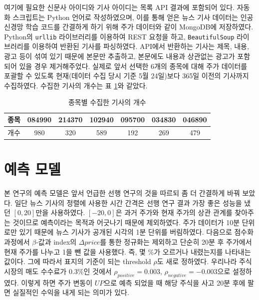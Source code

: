 \documentclass[a4paper,10pt]{article}
\begin{document}
여기에 필요한 신문사 아이디와 기사 아이디는 목록 API 결과에 포함되어 있다.
자동화 스크립트는 Python 언어로 작성하였으며, 이를 통해 얻은 뉴스 기사 데이터는 인공 신경망 학습 코드를 간결하게 하기 위해 주가 데이터와 같이 MongoDB에 저장하였다.
Python의 \texttt{urllib} 라이브러리를 이용하여 REST 요청을 하고, \texttt{BeautifulSoup} 라이브러리를 이용하여 반환된 기사를 파싱하였다.
API에서 반환하는 기사는 제목, 내용, 광고 등이 섞여 있기 때문에 본문만 추출하고, 본문에도 내용과 상관없는 광고가 포함되어 있을 경우 제거해주었다.
실제로 앞서 선택한 6개의 종목에 대해 주가 데이터를 포괄할 수 있도록 현재(데이터 수집 당시 기준 5월 24일)보다 365일 이전의 기사까지 수집하였다.
수집한 기사의 개수는 표 \ref{tbl:number_of_articles}와 같았다.
\begin{table}[h]
\begin{tabular}{|c||c|c|c|c|c|c|}
\hline
종목 & 084990 & 214370 & 102940 & 095700 & 034830 & 046890 \\
\hline
개수 & 980 & 320 & 589 & 192 & 269 & 479 \\
\hline
\end{tabular}
\centering
\caption{종목별 수집한 기사의 개수}
\label{tbl:number_of_articles}
\end{table}

\section{예측 모델}

본 연구의 예측 모델은 앞서 언급한 선행 연구의 것을 따르되 좀 더 간결하게 바꿔 보았다.
일단 뉴스 기사의 정렬에 사용한 시간 간격은 선행 연구 결과 가장 좋은 성능을 냈던 $[0, 20]$만을 사용하였다.
$[-20, 0]$은 과거 주가와 현재 주가의 상관 관계를 찾아주는 것이므로 예측이라는 목적과 어긋나기 때문에 제외하였다.
주가 데이터가 10분 단위로만 있기 때문에 뉴스 기사가 공개된 시각의 1분 단위를 버림하였다.
다음으로 점수화 과정에서 $\beta$-값과 index의 $\Delta price$를 통한 정규화는 제외하고 단순히 20분 후 주가에서 현재 주가를 나누고 1을 뺀 값을 사용했다.
즉, 몇 \%가 오르거나 내렸는지를 나타내는 값이다.
그에 따라서 표지의 기준이 되는 threshold $\rho$도 새로 정하였다.
우리나라 주식 시장의 매도 수수료가 $0.3\%$인 것에서 $\rho_{positive}=0.003$, $\rho_{negative}=-0.003$으로 설정하였다.
이렇게 하면 주가 변동이 $UP$으로 예측 되었을 때 해당 주식을 사고 20분 후에 팔면 실질적인 수익을 내게 되는 의미가 있다.
\end{document}

